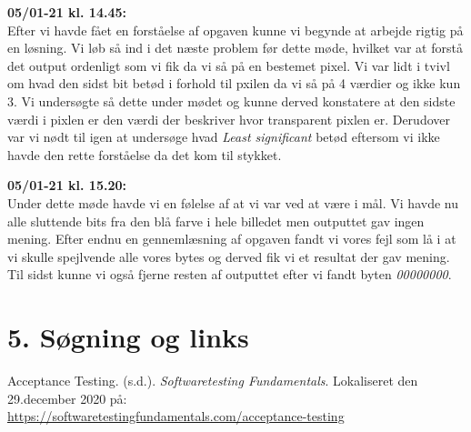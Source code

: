 \documentclass[10pt]{report}
\begin{document}
\noindent\textbf{05/01-21 kl. 14.45:}\\
\noindent Efter vi havde fået en forståelse af opgaven kunne vi begynde at arbejde rigtig på en løsning. Vi løb så ind i det næste problem før dette møde, hvilket var at forstå det output ordenligt som vi fik da vi så på en bestemet pixel. Vi var lidt i tvivl om hvad den sidst bit betød i forhold til pxilen da vi så på 4 værdier og ikke kun 3. Vi undersøgte så dette under mødet og kunne derved konstatere at den sidste værdi i pixlen er den værdi der beskriver hvor transparent pixlen er. Derudover var vi nødt til igen at undersøge hvad \textit{Least significant} betød eftersom vi ikke havde den rette forståelse da det kom til stykket.

\noindent\textbf{05/01-21 kl. 15.20:}\\
\noinden Under dette møde havde vi en følelse af at vi var ved at være i mål. Vi havde nu alle sluttende bits fra den blå farve i hele billedet men outputtet gav ingen mening. Efter endnu en gennemlæsning af opgaven fandt vi vores fejl som lå i at vi skulle spejlvende alle vores bytes og derved fik vi et resultat der gav mening. Til sidst kunne vi også fjerne resten af outputtet efter vi fandt byten \textit{00000000}.

\chapter*{5. Søgning og links}
\pagestyle{fancy}
\noindent Acceptance Testing. (s.d.). \textit{Softwaretesting Fundamentals}. Lokaliseret den 29.december 2020 på:\\
\href{https://softwaretestingfundamentals.com/acceptance-testing}{https://softwaretestingfundamentals.com/acceptance-testing}
\end{document}

